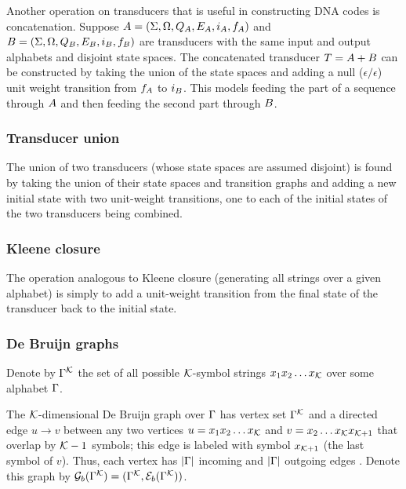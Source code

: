 \documentclass[english]{article}
\begin{document}
Another operation on transducers that is useful in constructing DNA codes
is concatenation.
Suppose
 $A = (\Sigma, \Omega, Q_{A}, E_{A}, i_{A}, f_{A})$ and
 $B = (\Sigma, \Omega, Q_{B}, E_{B}, i_{B}, f_{B})$
are transducers with the same input and output alphabets and disjoint state spaces.
The concatenated transducer $T = A + B$ can be constructed by
taking the union of the state spaces and adding a null ($\epsilon/\epsilon$) unit weight transition
from $f_{A}$ to $i_{B}$.
This models feeding the part of a sequence through $A$ and then feeding the second part through $B$.

\subsubsection{Transducer union}

The union of two transducers (whose state spaces are assumed disjoint)
is found by taking the union of their state spaces and transition graphs
and adding a new initial state with two unit-weight transitions, one to each of the initial states
of the two transducers being combined.

\subsubsection{Kleene closure}

The operation analogous to Kleene closure (generating all strings over a given alphabet)
is simply to add a unit-weight transition from the final state of the transducer back to the initial state.

\subsubsection{De Bruijn graphs}

Denote by $\Gamma^{\cal K}$
the set of all possible ${\cal K}$-symbol strings
$x_1 x_2 \ldots x_{\cal K}$ over some alphabet $\Gamma$.

The ${\cal K}$-dimensional De Bruijn graph over $\Gamma$
has vertex set $\Gamma^{\cal K}$
and a directed edge $u \to v$ between any two vertices
$u=x_1 x_2 \ldots x_{\cal K}$ and $v=x_2 \ldots x_{\cal K} x_{{\cal K}+1}$
that overlap by ${\cal K}-1$ symbols; this edge is labeled with symbol $x_{{\cal K}+1}$ (the last symbol of $v$).
Thus, each vertex has $|\Gamma|$ incoming and $|\Gamma|$ outgoing edges \cite{DeBruijn1946,PevznerEtAl2001}.
Denote this graph by ${\cal G}_b(\Gamma^{\cal K}) = (\Gamma^{\cal K},{\cal E}_b(\Gamma^{\cal K}))$.
\end{document}
